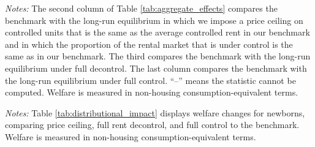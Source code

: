 \documentclass[parskip=full]{article}
\newenvironment{fignote2}[1]
{
\par
\medskip
\begin{minipage}{#1}
\footnotesize
}
{
\end{minipage}
}
\begin{document}
\begin{table}[H]
    \centering
    \caption{Aggregate effects}
    \vspace{-0.5cm}
    \label{tab:aggregate_effects}
    
    \vspace{-0.45cm}
    \begin{fignote2}{0.79\textwidth}
      \textit{Notes:} The second column of Table \ref{tab:aggregate_effects} compares the benchmark with the long-run equilibrium in which we impose a price ceiling on controlled units that is the same as the average controlled rent in our  benchmark and in which the proportion of the rental market that is under control is the same as in our benchmark. The third compares the benchmark with the long-run equilibrium under full decontrol. The last column compares the benchmark with the long-run equilibrium under full control. “--” means the statistic cannot be computed. Welfare is measured in non-housing consumption-equivalent terms.
    \end{fignote2}
\end{table}

    
\begin{table}[H]
    \centering
    \caption{Distributional effects on newborns' welfare by income quintile ($\% \Delta$ in welfare)}
    \vspace{-0.5cm}
    \label{tab:distributional_impact}
    
    \vspace{-0.45cm}
    \begin{fignote2}{0.53\textwidth}
      \textit{Notes:} Table \ref{tab:distributional_impact} displays welfare changes for newborns, comparing price ceiling, full rent decontrol, and full control to the benchmark. Welfare is measured in non-housing consumption-equivalent terms.
    \end{fignote2}
\end{table}
\end{document}
